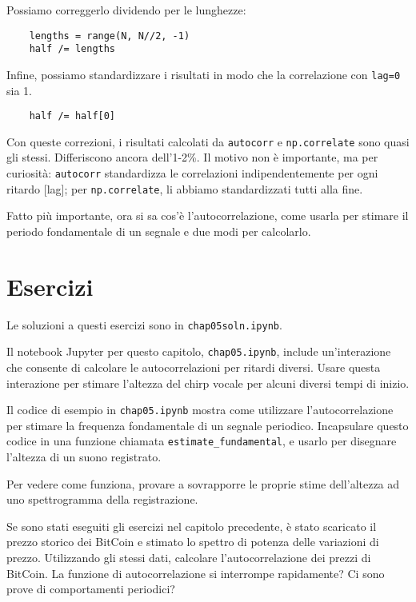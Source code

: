 \documentclass[12pt,a4paper]{book}
\begin{document}
Possiamo correggerlo dividendo per le lunghezze:

\begin{verbatim} 
    lengths = range(N, N//2, -1)
    half /= lengths
 \end{verbatim} 

Infine, possiamo standardizzare i risultati in modo che la correlazione con {\tt lag=0} sia 1.

\begin{verbatim} 
    half /= half[0]
 \end{verbatim} 

Con queste correzioni, i risultati calcolati da {\tt autocorr} e {\tt np.correlate} sono quasi gli stessi. Differiscono ancora dell'1-2\%. Il motivo non è importante, ma per curiosità: {\tt autocorr} standardizza le correlazioni indipendentemente per ogni ritardo [lag]; per {\tt np.correlate}, li abbiamo standardizzati tutti alla fine.

Fatto più importante, ora si sa cos'è l'autocorrelazione, come usarla per stimare il periodo fondamentale di un segnale e due modi per calcolarlo.

\section{Esercizi} 

Le soluzioni a questi esercizi sono in {\tt chap05soln.ipynb}.

\begin{exercise} Il notebook Jupyter per questo capitolo, {\tt chap05.ipynb}, include un'interazione che consente di calcolare le autocorrelazioni per ritardi diversi. Usare questa interazione per stimare l'altezza del chirp vocale per alcuni diversi tempi di inizio. \end{exercise} 

\begin{exercise} Il codice di esempio in \verb"chap05.ipynb" mostra come utilizzare l'autocorrelazione per stimare la frequenza fondamentale di un segnale periodico. Incapsulare questo codice in una funzione chiamata \verb"estimate_fundamental", e usarlo per disegnare l'altezza di un suono registrato.

Per vedere come funziona, provare a sovrapporre le proprie stime dell'altezza ad uno spettrogramma della registrazione. \end{exercise} 

\begin{exercise} Se sono stati eseguiti gli esercizi nel capitolo precedente, è stato scaricato il prezzo storico dei BitCoin e stimato lo spettro di potenza delle variazioni di prezzo. Utilizzando gli stessi dati, calcolare l'autocorrelazione dei prezzi di BitCoin. La funzione di autocorrelazione si interrompe rapidamente? Ci sono prove di comportamenti periodici? \end{exercise} 
\end{document}
